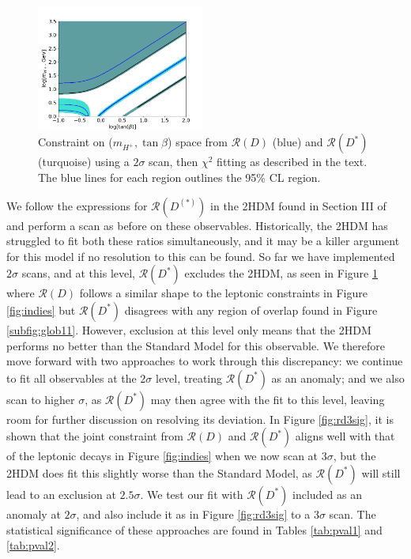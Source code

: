 \documentclass[a4paper,12pt]{article}
\begin{document}
\begin{figure}[ht]
    \centering
    \includegraphics[width=0.49\textwidth]{rd_both196sig.png}
    \caption{\label{fig:rds}Constraint on ($m_{H^+},\tan\beta$) space from $\mathcal{R}(D)$ (blue) and $\mathcal{R}(D^*)$ (turquoise) using a $2\sigma$ scan, then $\chi^2$ fitting as described in the text. 
    The blue lines for each region outlines the 95\% CL region.}
\end{figure}
We follow the expressions for $\mathcal{R}(D^{(*)})$ in the 2HDM found in Section III of \cite{rds} and perform a scan as before on these observables. 
Historically, the 2HDM has struggled to fit both these ratios simultaneously, and it may be a killer argument for this model if no resolution to this can be found. 
So far we have implemented $2\sigma$ scans, and at this level, $\mathcal{R}(D^*)$ excludes the 2HDM, as seen in Figure \ref{fig:rds} where $\mathcal{R}(D)$ follows a similar shape to the leptonic constraints in Figure \ref{fig:indies} but $\mathcal{R}(D^*)$ disagrees with any region of overlap found in Figure \ref{subfig:glob11}.
However, exclusion at this level only means that the 2HDM performs no better than the Standard Model for this observable. 
We therefore move forward with two approaches to work through this discrepancy: we continue to fit all observables at the $2\sigma$ level, treating $\mathcal{R}(D^*)$ as an anomaly; and we also scan to higher $\sigma$, as $\mathcal{R}(D^*)$ may then agree with the fit to this level, leaving room for further discussion on resolving its deviation.
In Figure \ref{fig:rd3sig}, it is shown that the joint constraint from $\mathcal{R}(D)$ and $\mathcal{R}(D^*)$ aligns well with that of the leptonic decays in Figure \ref{fig:indies} when we now scan at $3\sigma$, but the 2HDM does fit this slightly worse than the Standard Model, as $\mathcal{R}(D^*)$ will still lead to an exclusion at $2.5\sigma$. 
We test our fit with $\mathcal{R}(D^*)$ included as an anomaly at $2\sigma$, and also include it as in Figure \ref{fig:rd3sig} to a $3\sigma$ scan. 
The statistical significance of these approaches are found in Tables \ref{tab:pval1} and \ref{tab:pval2}.
\end{document}
